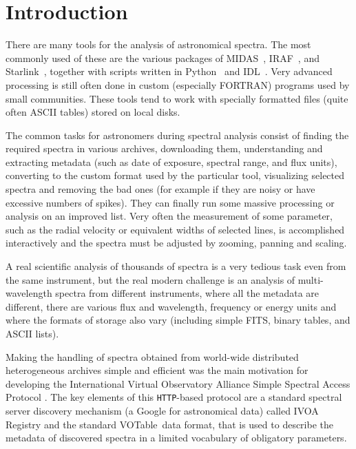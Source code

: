 \documentclass[final,authoryear,5p,times,twocolumn]{elsarticle}
\newcommand{\ssap}{\texttt{SSAP}}
\newcommand{\votable}{VOTable}
\newcommand{\IRAF}{\textsf{\small IRAF}}
\newcommand{\IDL}{\textsf{\small IDL}}
\newcommand{\python}{\textsf{\small Python}}
\newcommand{\Starlink}{\textsf{\small Starlink}}
\newcommand{\ascl}[1]{\href{http://www.ascl.net/#1}{ascl:#1}}
\begin{document}
\section{Introduction}

There are many tools for the analysis of astronomical spectra.  The most
commonly used of these are the various packages of MIDAS\
\citep[][\ascl{1302.017}]{1992ASPC...25..115W}, \IRAF\
\citep[][\ascl{9911.002}]{2012ASPC..461..595F}, and \Starlink\
\citep[][\ascl{1110.012}]{1982QJRAS..23..485D}, together with scripts
written in \python\ \citep[e.g.,][]{2013A&A...558A..33A} and \IDL\ \citep[e.g.,][]{1993ASPC...52..246L}.
Very advanced processing is still often done in custom
(especially FORTRAN) programs used by small communities.  These tools tend to
work with specially formatted files (quite often ASCII tables) stored on local
disks.

The common tasks for astronomers during spectral analysis consist of finding
the required spectra in various archives, downloading them, understanding and
extracting metadata (such as date of exposure, spectral range, and flux units),
converting to the custom format used by the particular tool, visualizing
selected spectra and  removing the bad ones (for example if they are
noisy or have excessive numbers of spikes). They can finally
run some massive processing or analysis on an
improved list.  Very often the measurement of some parameter, such as the radial
velocity or equivalent widths of selected lines, is accomplished interactively
and the spectra must be adjusted by zooming, panning and scaling.

A real scientific analysis of thousands of spectra is a very
tedious task even from the same instrument, but the real modern challenge is an
analysis of multi-wavelength spectra from different instruments, where all the
metadata are different, there are various flux and wavelength, frequency or
energy units  and where the formats of storage also vary (including simple FITS, binary
tables, and ASCII lists).

Making the handling of spectra obtained from world-wide distributed
heterogeneous archives simple and efficient was the main motivation for
developing the International Virtual Observatory Alliance Simple Spectral
Access Protocol \citep[IVOA \ssap;][]{ssap}. The key elements of this
\texttt{HTTP}-based protocol are a standard spectral server discovery mechanism (a
Google for astronomical data) called IVOA Registry \citep{registry} and  the
standard \votable\ data format\citep{2004tivo.conf..118O},
that is used to describe the metadata of discovered spectra in a limited vocabulary of
obligatory parameters.
\end{document}
